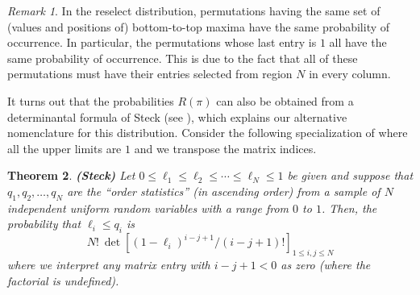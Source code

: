 \documentclass[11pt]{amsart}   %
\newtheorem{theorem}{Theorem}[section]
\theoremstyle{definition}
\theoremstyle{remark}
\newtheorem{remark}[theorem]{Remark}
\numberwithin{equation}{section}
\theoremstyle{theorem}
\begin{document}
\begin{remark}
In the reselect distribution, permutations having the same set of (values and
positions of) bottom-to-top maxima have the same probability of occurrence.
In particular, the permutations whose last entry is $1$ all have the same
probability of occurrence.  This is due to the fact that all of these
permutations must have their entries selected from region $N$ in every column.
\end{remark}

It turns out that the probabilities $R(\pi)$ can also be obtained from a
determinantal formula of Steck (see \cite{steck,pitman}), which explains our
alternative nomenclature for this distribution.  Consider the
following specialization of \cite[Theorem 1]{pitman} where all the upper limits
are $1$ and we transpose the matrix indices.

\begin{theorem}{\bf (Steck)}
Let $0 \leq \ell_1 \leq \ell_2 \leq \cdots \leq \ell_N \leq 1$ be given and suppose that $q_1, q_2, \ldots, q_N$ are the ``order statistics'' (in ascending order) from a sample of $N$ independent uniform random variables with a range from $0$ to $1$.  Then, the probability that $\ell_i \leq q_i$ is 
\[ N! \ \det\left[  (1-\ell_i)^{i-j+1} / (i-j+1)!  \right]_{1 \leq i,j \leq N} \]
where we interpret any matrix entry with $i-j+1<0$ as zero (where the factorial is undefined).
\end{theorem}
\end{document}
